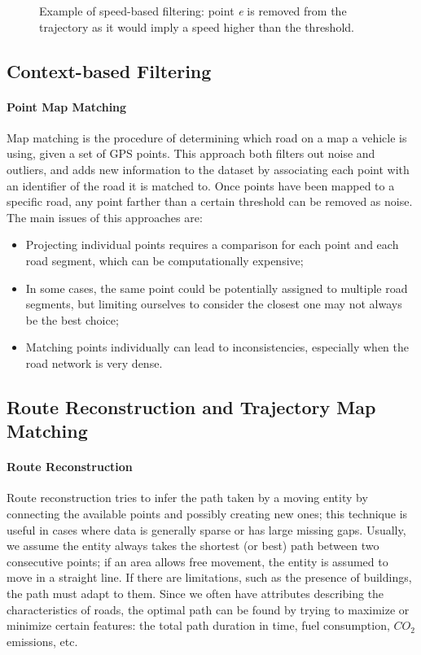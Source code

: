 \begin{figure}[!ht]
    \centering
    
    \caption{Example of speed-based filtering: point \textit{e} is removed from the trajectory as it would imply a speed higher than the threshold.}
    \label{fig:filtering-speed}
\end{figure}

\subsection{Context-based Filtering}

\paragraph{Point Map Matching}
Map matching is the procedure of determining which road on a map a vehicle is using, given a set of GPS points. This approach both filters out noise and outliers, and adds new information to the dataset by associating each point with an identifier of the road it is matched to. Once points have been mapped to a specific road, any point farther than a certain threshold can be removed as noise.\\
The main issues of this approaches are:
\begin{itemize}
    \item Projecting individual points requires a comparison for each point and each road segment, which can be computationally expensive;
    \item In some cases, the same point could be potentially assigned to multiple road segments, but limiting ourselves to consider the closest one may not always be the best choice;
    \item Matching points individually can lead to inconsistencies, especially when the road network is very dense.
\end{itemize}

\subsection{Route Reconstruction and Trajectory Map Matching}

\paragraph{Route Reconstruction}
Route reconstruction tries to infer the path taken by a moving entity by connecting the available points and possibly creating new ones; this technique is useful in cases where data is generally sparse or has large missing gaps. Usually, we assume the entity always takes the shortest (or best) path between two consecutive points; if an area allows free movement, the entity is assumed to move in a straight line. If there are limitations, such as the presence of buildings, the path must adapt to them. Since we often have attributes describing the characteristics of roads, the optimal path can be found by trying to maximize or minimize certain features: the total path duration in time, fuel consumption, $CO_2$ emissions, etc.

